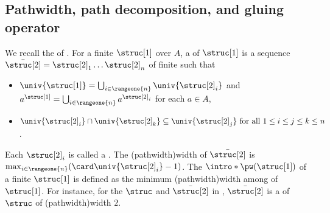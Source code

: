 \documentclass[10pt,a4paper]{article}
\theoremstyle{definition}
\theoremstyle{remark}
\newcommand{\mul}[1]{\bar{#1}}
\begin{document}
%
%
%
%
%
%
%
%
%
%
%
%
%
%

\subsection{Pathwidth, path decomposition, and gluing operator}
\AP
We recall the  of  \cite[Def.\ 9.12]{courcelleGraphStructureMonadic2012}.
For a finite  $\struc[1]$ over $A$,
a \intro*{} of $\struc[1]$ is a sequence $\mul{\struc[2]} = \struc[2]_1 \dots \struc[2]_n$ of finite  such that
\begin{itemize}
    \item $\univ{\struc[1]} = \bigcup_{i \in \rangeone{n}} \univ{\struc[2]_{i}}$ and $a^{\struc[1]} = \bigcup_{i \in \rangeone{n}} a^{\struc[2]_{i}}$ for each $a \in A$,
    \item $\univ{\struc[2]_i} \cap \univ{\struc[2]_k} \subseteq \univ{\struc[2]_j} \mbox{ for all $1 \le i \le j \le k \le n$}$.
\end{itemize}
Each $\struc[2]_i$ is called a \intro*{}.
\AP
The \intro*\kl(pathwidth){width} of $\mul{\struc[2]}$ is $\max_{i \in \rangeone{n}}(\card \univ{\struc[2]_i} - 1)$.
The \intro*{} $\intro*\pw(\struc[1])$ of a finite  $\struc[1]$ is defined as the minimum \kl(pathwidth){width} among  of $\struc[1]$.
For instance, for the $\struc$ and $\mul{\struc[2]}$ in ,
$\mul{\struc[2]}$ is a  of $\struc$ of \kl(pathwidth){width} $2$.
\end{document}
